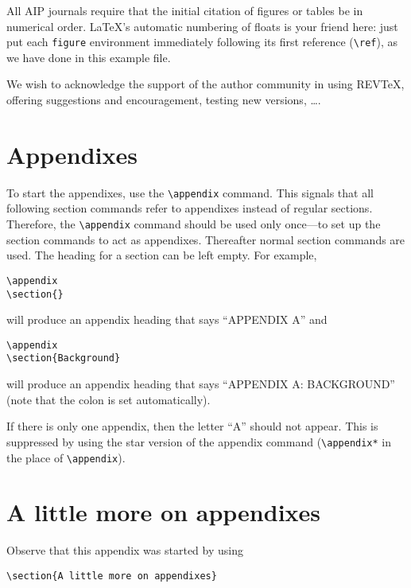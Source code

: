 \documentclass[%
 aip,
 jmp,%
 amsmath,amssymb,
 reprint,%
]{revtex4-1}
\begin{document}
All AIP journals require that the initial citation of
figures or tables be in numerical order.
\LaTeX's automatic numbering of floats is your friend here:
just put each \texttt{figure} environment immediately following 
its first reference (\verb+\ref+), as we have done in this example file. 

\begin{acknowledgments}
We wish to acknowledge the support of the author community in using
REV\TeX{}, offering suggestions and encouragement, testing new versions,
\dots.
\end{acknowledgments}

\appendix

\section{Appendixes}

To start the appendixes, use the \verb+\appendix+ command.
This signals that all following section commands refer to appendixes
instead of regular sections. Therefore, the \verb+\appendix+ command
should be used only once---to set up the section commands to act as
appendixes. Thereafter normal section commands are used. The heading
for a section can be left empty. For example,
\begin{verbatim}
\appendix
\section{}
\end{verbatim}
will produce an appendix heading that says ``APPENDIX A'' and
\begin{verbatim}
\appendix
\section{Background}
\end{verbatim}
will produce an appendix heading that says ``APPENDIX A: BACKGROUND''
(note that the colon is set automatically).

If there is only one appendix, then the letter ``A'' should not
appear. This is suppressed by using the star version of the appendix
command (\verb+\appendix*+ in the place of \verb+\appendix+).

\section{A little more on appendixes}

Observe that this appendix was started by using
\begin{verbatim}
\section{A little more on appendixes}
\end{verbatim}
\end{document}
